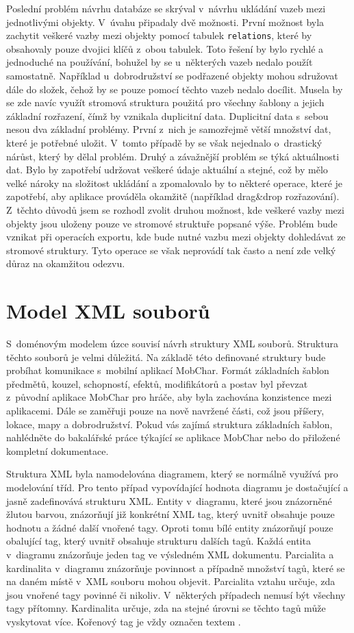 \documentclass[thesis=B,czech]{resources/FITthesis}[2012/06/26]
\begin{document}
Poslední problém návrhu databáze se skrýval v~návrhu ukládání vazeb mezi jednotlivými objekty. V~úvahu připadaly dvě možnosti. První možnost byla zachytit veškeré vazby mezi objekty pomocí tabulek \texttt{relations}, které by obsahovaly pouze dvojici klíčů z~obou tabulek. Toto řešení by bylo rychlé a jednoduché na používání, bohužel by se u~některých vazeb nedalo použít samostatně. Například u~dobrodružství se podřazené objekty mohou sdružovat dále do složek, čehož by se pouze pomocí těchto vazeb nedalo docílit. Musela by se zde navíc využít stromová struktura použitá pro všechny šablony a jejich základní rozřazení, čímž by vznikala duplicitní data. Duplicitní data s~sebou nesou dva základní problémy. První z~nich je samozřejmě větší množství dat, které je potřebné uložit. V~tomto případě by se však nejednalo o~drastický nárůst, který by dělal problém. Druhý a závažnější problém se týká aktuálnosti dat. Bylo by zapotřebí udržovat veškeré údaje aktuální a stejné, což by mělo velké nároky na složitost ukládání a zpomalovalo by to některé operace, které je zapotřebí, aby aplikace prováděla okamžitě (například drag\&drop rozřazování). Z~těchto důvodů jsem se rozhodl zvolit druhou možnost, kde veškeré vazby mezi objekty jsou uloženy pouze ve stromové struktuře popsané výše. Problém bude vznikat při operacích exportu, kde bude nutné vazbu mezi objekty dohledávat ze stromové struktury. Tyto operace se však neprovádí tak často a není zde velký důraz na okamžitou odezvu. 

	\section{Model XML souborů}
S~doménovým modelem úzce souvisí návrh struktury XML souborů. Struktura těchto souborů je velmi důležitá. Na základě této definované struktury bude probíhat komunikace s~mobilní aplikací MobChar. Formát základních šablon předmětů, kouzel, schopností, efektů, modifikátorů a postav byl převzat z~původní aplikace MobChar pro hráče, aby byla zachována konzistence mezi aplikacemi. Dále se zaměřuji pouze na nově navržené části, což jsou příšery, lokace, mapy a dobrodružství. Pokud vás zajímá struktura základních šablon, nahlédněte do bakalářské práce týkající se aplikace MobChar\cite{Weberova_2017} nebo do přiložené kompletní dokumentace.\par

Struktura XML byla namodelována diagramem, který se normálně využívá pro modelování tříd. Pro tento případ vypovídající hodnota diagramu je dostačující a jasně zadefinovává strukturu XML. Entity v~diagramu, které jsou znázorněné žlutou barvou, znázorňují již konkrétní XML tag, který uvnitř obsahuje pouze hodnotu a žádné další vnořené tagy. Oproti tomu bílé entity znázorňují pouze obalující tag, který uvnitř obsahuje strukturu dalších tagů. Každá entita v~diagramu znázorňuje jeden tag ve výsledném XML dokumentu. Parcialita a kardinalita v~diagramu znázorňuje povinnost a případně množství tagů, které se na daném místě v~XML souboru mohou objevit. Parcialita vztahu určuje, zda jsou vnořené tagy povinné či nikoliv. V~některých případech nemusí být všechny tagy přítomny. Kardinalita určuje, zda na stejné úrovni se těchto tagů může vyskytovat více. Kořenový tag je vždy označen textem   .
\end{document}
